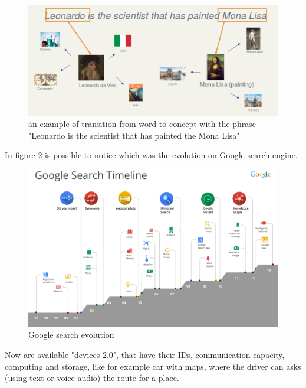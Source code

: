 \begin{description}
\begin{figure}
                                \end{figure}
                                \begin{figure}
                                    \caption{an example of transition from word to concept with the phrase
                                             "Leonardo is the scientist that has painted the Mona Lisa"}
                                    \label{img:leonardo}
                                    \includegraphics[width=\textwidth]{Images/leonardo}
                                \end{figure}
\end{description}
In figure \ref{img:googleEvolution} is possible to notice which was the evolution on Google search engine.

\begin{figure}
    \caption{Google search evolution}
    \label{img:googleEvolution}
    \includegraphics[width=\textwidth]{Images/googleGeneration}
\end{figure}
Now are available "devices $2.0$", that have their IDs, communication capacity, computing and storage, like
for example car with maps, where the driver can asks (using text or voice audio) the route for a place.

